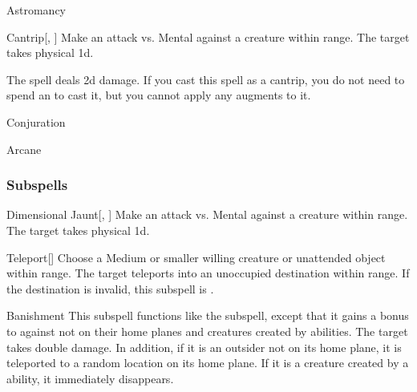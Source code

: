 \newpage
\begin{spellsection}{Astromancy}

\begin{spellheader}
\end{spellheader}


\begin{ability}{Cantrip}[, ]
Make an attack vs. Mental against a creature within \rngmed range.
\hit The target takes physical  \minus1d.
\end{ability}



 The spell deals \minus2d damage. If you cast this spell as a cantrip,
you do not need to spend an  to cast it,
but you cannot apply any augments to it.


 Conjuration

 Arcane
\end{spellsection}


\subsubsection{Subspells}


\begin{ability}[\nth{1}]{Dimensional Jaunt}[, ]
Make an attack vs. Mental against a creature within \rngmed range.
\hit The target takes physical  \plus1d.
\end{ability}
\vspace{0.25em}


\begin{ability}[\nth{1}]{Teleport}[]
Choose a Medium or smaller willing creature or unattended object within \rngclose range.
The target teleports into an unoccupied destination within range.
If the destination is invalid, this subspell is .
\end{ability}
\vspace{0.25em}


\begin{ability}[\nth{2}]{Banishment}
This subspell functions like the  subspell, except that it gains a  bonus to  against  not on their home planes and creatures created by  abilities.
\crit The target takes double damage.
In addition, if it is an outsider not on its home plane, it is teleported to a random location on its home plane.
If it is a creature created by a  ability, it immediately disappears.
\end{ability}
\vspace{0.25em}


